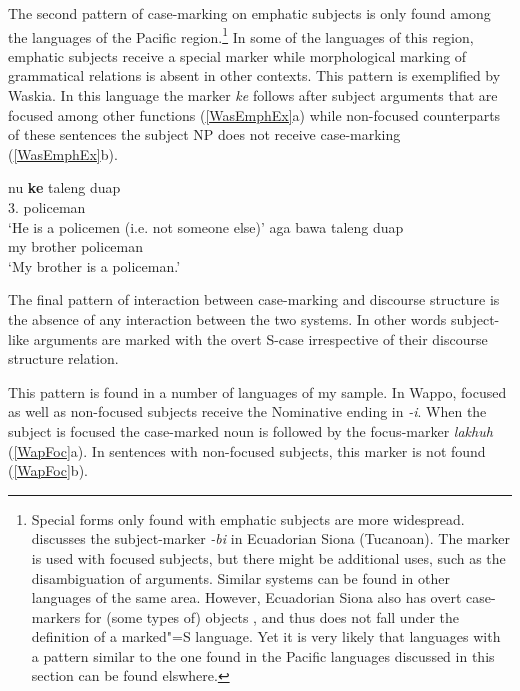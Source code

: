 The second pattern of case-marking on emphatic subjects is only found among the languages of the Pacific region.\footnote{Special forms only found with emphatic subjects are more widespread. 
\citet[158--163]{Bruil:2014} discusses the subject-marker \emph{-bi} in Ecuadorian Siona (Tucanoan). 
The marker is used with focused subjects, but there might be additional uses, such as the disambiguation of arguments. 
Similar systems can be found in other languages of the same area. 
However, Ecuadorian Siona also has overt case-markers for (some types of) objects \citep[163--169]{Bruil:2014}, and thus does not fall under the definition of a marked"=S language. 
Yet it is very likely that languages with a pattern similar to the one found in the Pacific languages discussed in this section can be found elswhere.}
In some of the languages of this region, emphatic subjects receive a special marker while morphological marking of grammatical relations is absent in other contexts.
This pattern is exemplified by Was\-kia. 
In this language the marker \emph{ke} follows after subject arguments that are focused among other functions (\ref{WasEmphEx}a) while non-focused counterparts of these sentences the subject NP does not receive case-marking (\ref{WasEmphEx}b).


\begin{exe}\ex\label{WasEmphEx}
\begin{xlist}
\ex\gll nu \textbf{ke} {taleng duap}\\
3\sg{}.\pronoun{} \nom{} policeman\\
\glt `He is a policemen (i.e. not someone else)'
\ex\gll aga bawa {taleng duap}\\
my brother policeman\\
\glt `My brother is a policeman.'
\end{xlist}
\end{exe}


The final pattern of interaction between case-marking and discourse structure is the absence of any interaction between the two systems. 
In other words subject-like arguments are marked with the overt S-case irrespective of their discourse structure relation.

This pattern is found in a number of languages of my sample. 
In Wappo, focused as well as non-focused subjects receive the Nominative ending in \emph{-i}. 
When the subject is focused the case-marked noun is followed by the focus-marker \emph{lakhuh} (\ref{WapFoc}a). 
In sentences with non-focused subjects, this marker is not found (\ref{WapFoc}b).

